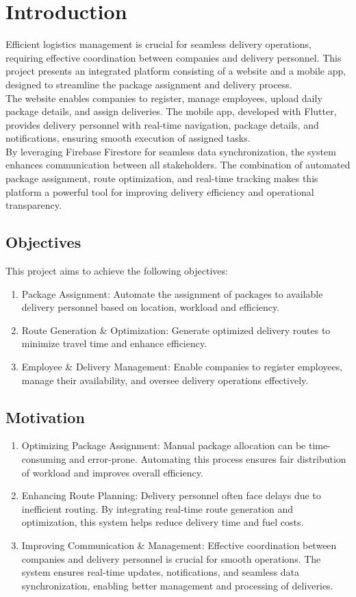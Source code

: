 \chapter{Introduction}
\label{Introduction}
Efficient logistics management is crucial for seamless delivery operations, requiring effective coordination between companies and delivery personnel. This project presents an integrated platform consisting of a website and a mobile app, designed to streamline the package assignment and delivery process.  
\\
The website enables companies to register, manage employees, upload daily package details, and assign deliveries. The mobile app, developed with Flutter, provides delivery personnel with real-time navigation, package details, and notifications, ensuring smooth execution of assigned tasks.  
\\
By leveraging Firebase Firestore for seamless data synchronization, the system enhances communication between all stakeholders. The combination of automated package assignment, route optimization, and real-time tracking makes this platform a powerful tool for improving delivery efficiency and operational transparency. 
\section{Objectives}
This project aims to achieve the following objectives:
\begin{enumerate}
    \item Package Assignment: Automate the assignment of packages to available delivery personnel based on location, workload and efficiency.
    \item Route Generation \& Optimization: Generate optimized delivery routes to minimize travel time and enhance efficiency.
    \item Employee \& Delivery Management: Enable companies to register employees, manage their availability, and oversee delivery operations effectively.
\end{enumerate}
\section{Motivation}
\begin{enumerate}
    \item Optimizing Package Assignment: Manual package allocation can be time-consuming and error-prone. Automating this process ensures fair distribution of workload and improves overall efficiency.
    \item Enhancing Route Planning: Delivery personnel often face delays due to inefficient routing. By integrating real-time route generation and optimization, this system helps reduce delivery time and fuel costs.
    \item Improving Communication \& Management: Effective coordination between companies and delivery personnel is crucial for smooth operations. The system ensures real-time updates, notifications, and seamless data synchronization, enabling better management and processing of deliveries.
\end{enumerate}

